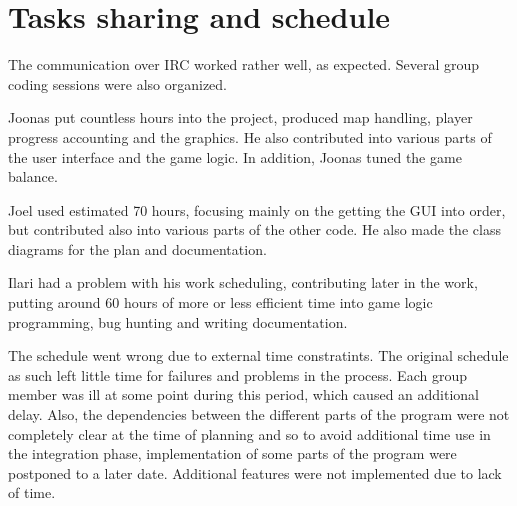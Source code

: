 \documentclass[11pt]{article}
\begin{document}
%  
\section{Tasks sharing and schedule}
\label{sec-5}


 
The communication over IRC worked rather well, as expected. Several
group coding sessions were also organized.

Joonas put countless hours into the project, produced map handling,
player progress accounting and the graphics. He also contributed into
various parts of the user interface and the game logic. In addition,
Joonas tuned the game balance.

Joel used estimated 70 hours, focusing mainly on the getting the GUI
into order, but contributed also into various parts of the other
code. He also made the class diagrams for the plan and documentation.

Ilari had a problem with his work scheduling, contributing later in
the work, putting around 60 hours of more or less efficient time into
game logic programming, bug hunting and writing documentation.

 
The schedule went wrong due to external time constratints. The
original schedule as such left little time for failures and problems
in the process. Each group member was ill at some point during this
period, which caused an additional delay. Also, the dependencies
between the different parts of the program were not completely clear
at the time of planning and so to avoid additional time use in the
integration phase, implementation of some parts of the program were
postponed to a later date. Additional features were not implemented
due to lack of time.
\end{document}
